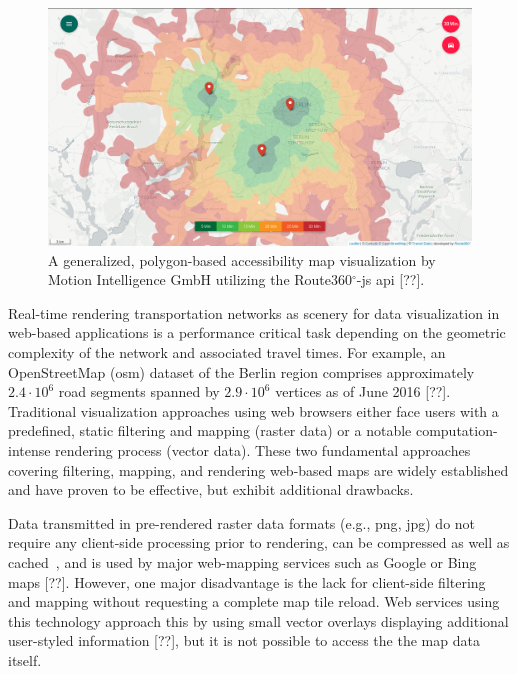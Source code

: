     \begin{figure}[htb]
      \centering
      \includegraphics[width=\linewidth]
        {./img/screenshot-r360js-demo.png}
      \caption{A generalized, polygon-based accessibility map visualization
        by Motion Intelligence GmbH utilizing the Route360$^\circ$-\acrshort{js}
        \acrshort{api} [??].}
      \label{fig:intro:r360d}
    \end{figure}

    Real-time rendering transportation networks as scenery for data
    visualization in web-based applications is a performance critical task
    depending on the geometric complexity of the network and associated travel
    times. For example, an OpenStreetMap (\acrshort{osm}) dataset of the Berlin
    region comprises approximately $2.4 \cdot 10^6$ road segments spanned by
    $2.9 \cdot 10^6$ vertices as of June 2016 [??]. Traditional visualization
    approaches using web browsers either face users with a predefined, static
    filtering and mapping (raster data) or a notable computation-intense
    rendering process (vector data). These two fundamental approaches covering
    filtering, mapping, and rendering web-based maps are widely established and
    have proven to be effective, but exhibit additional drawbacks.\par

    Data transmitted in pre-rendered raster data formats (e.g., \acrshort{png},
    \acrshort{jpg}) do
    not require any client-side processing prior to rendering, can be compressed
    as well as cached~\cite{ESRI2006}, and is used by major web-mapping services
    such as Google or Bing maps [??]. However, one major disadvantage is the
    lack for client-side filtering and mapping without requesting a complete map
    tile reload. Web services using this technology approach this by using small
    vector overlays displaying additional user-styled information [??], but it
    is not possible to access the the map data itself.\par

